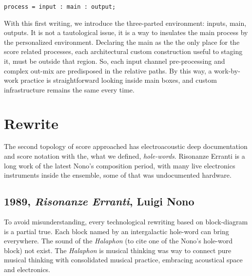 \documentclass[twoside,a4paper]{article}
\begin{document}
\begin{lstlisting}
process = input : main : output;
\end{lstlisting}

With this first writing, we introduce the three-parted environment: inputs, main, outputs. It is not a tautological issue, it is a way to insulates the main process by the personalized environment. Declaring the main as the the only place for the score related processes, each architectural custom construction useful to staging it, must be outside that region. So, each input channel pre-processing and complex out-mix are predisposed in the relative paths. By this way, a work-by-work practice is straightforward looking inside main boxes, and custom infrastructure remains the same every time. 


\section{Rewrite}
\label{sec:rewriting}

The second topology of score approached has electroacoustic deep documentation and score notation with the, what we defined, \emph{hole-words}. Risonanze Erranti is a long work of the latest Nono's composition period, with many live electronics instruments inside the ensemble, some of that was undocumented hardware. 


\subsection{1989, \emph{Risonanze Erranti}, Luigi Nono}

To avoid misunderstanding, every technological rewriting based on block-diagram is a partial true. Each block named by an intergalactic hole-word can bring everywhere. The sound of the \emph{Halaphon} (to cite one of the Nono's hole-word block) not exist. The \emph{Halaphon} is musical thinking was way to connect pure musical thinking with consolidated musical practice, embracing acoustical space and electronics. 
\end{document}
